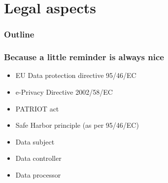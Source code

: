 \documentclass{beamer}
\begin{document}
\section{Legal aspects}

\begin{frame}
  \frametitle{Outline}
\end{frame}

\begin{frame}
    \frametitle{Because a little reminder is always nice}
    \begin{itemize}
        \item EU Data protection directive 95/46/EC
        \item e-Privacy Directive 2002/58/EC
        \item PATRIOT act
        \item Safe Harbor principle (as per 95/46/EC)
    \end{itemize}

    \begin{itemize}
        \item Data subject
        \item Data controller \checkmark
        \item Data processor \checkmark
    \end{itemize}
\end{frame}
\end{document}
